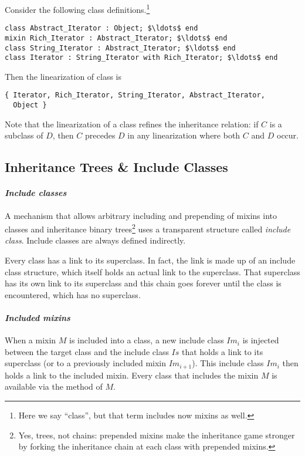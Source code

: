 \example Consider the following class definitions.\footnote{Here we say ``class'', but that term includes now mixins as well.}
\begin{lstlisting}
class Abstract_Iterator : Object; $\ldots$ end
mixin Rich_Iterator : Abstract_Iterator; $\ldots$ end
class String_Iterator : Abstract_Iterator; $\ldots$ end
class Iterator : String_Iterator with Rich_Iterator; $\ldots$ end
\end{lstlisting}
Then the linearization of class  is
\begin{lstlisting}
{ Iterator, Rich_Iterator, String_Iterator, Abstract_Iterator, 
  Object }
\end{lstlisting}

Note that the linearization of a class refines the inheritance relation: if $C$ is a subclass of $D$, then $C$ precedes $D$ in any linearization where both $C$ and $D$ occur. 

\subsection{Inheritance Trees \& Include Classes}
\label{sec:inheritance-trees}
\label{sec:include-classes}

\paragraph{\em Include classes}
A mechanism that allows arbitrary including and prepending of mixins into classes and inheritance binary trees\footnote{Yes, trees, not chains: prepended mixins make the inheritance game stronger by forking the inheritance chain at each class with prepended mixins.} uses a transparent structure called {\em include class}. Include classes are always defined indirectly.

Every class has a link to its superclass. In fact, the link is made up of an include class structure, which itself holds an actual link to the superclass. That superclass has its own link to its superclass and this chain goes forever until the  class is encountered, which has no superclass. 

\paragraph{\em Included mixins}
When a mixin $M$ is included into a class, a new include class $Im_i$ is injected between the target class and the include class $Is$ that holds a link to its superclass (or to a previously included mixin $Im_{i+1}$). This include class $Im_i$ then holds a link to the included mixin. Every class that includes the mixin $M$ is available via the  method of $M$. 


